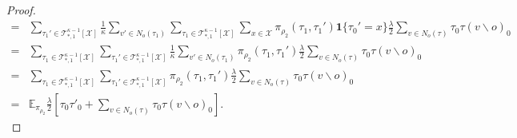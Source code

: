 \documentclass[12pt]{article}
\newcommand{\one}[1]{\mathbf{1}\{#1\}}
\newcommand{\tree}[2]{\mathcal{T}_{*, #1}^{#2}[\mathcal{X}]}
\numberwithin{equation}{section}
\begin{document}
\begin{proof}
\begin{align*}
        = & \sum_{\tau_1'\in\tree{1}{\kappa-1}}\frac1\kappa\sum_{v'\in N_o(\tau_1)}\sum_{\tau_1\in \tree{1}{\kappa-1}}\sum_{x\in\mathcal{X}}\pi_{\rho_2}(\tau_1, \tau_1')\one{\tau_0'=x}\frac\lambda2\sum_{v\in N_o(\tau)} \tau_0\tau(v\backslash o)_0                                                                    \\
        = & \sum_{\tau_1\in \tree{1}{\kappa-1}}\sum_{\tau_1'\in\tree{1}{\kappa-1}}\frac1\kappa\sum_{v'\in N_o(\tau_1)}\pi_{\rho_2}(\tau_1, \tau_1')\frac\lambda2\sum_{v\in N_o(\tau)} \tau_0\tau(v\backslash o)_0                                                                                                         \\
        = & \sum_{\tau_1\in \tree{1}{\kappa-1}}\sum_{\tau_1'\in\tree{1}{\kappa-1}}\pi_{\rho_2}(\tau_1, \tau_1')\frac\lambda2\sum_{v\in N_o(\tau)} \tau_0\tau(v\backslash o)_0                                                                                                                                             \\
        = & \mathbb{E}_{\pi_{\rho_2}}\frac\lambda2\left[\tau_0\tau'_0 + \sum_{v\in N_o(\tau)} \tau_0\tau(v\backslash o)_0\right].
    \end{align*}


\end{proof}
\end{document}
